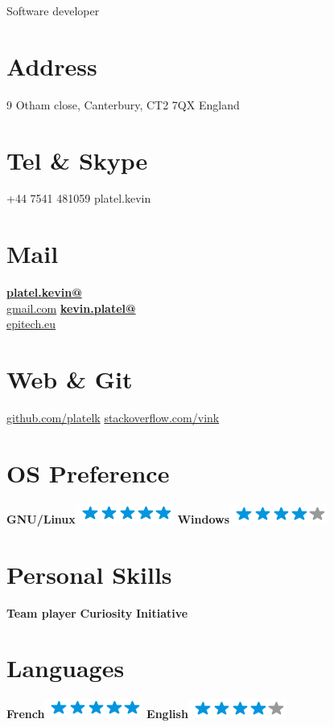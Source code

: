 \documentclass[]{friggeri-cv}
\begin{document}
      {Software developer}
      

\begin{aside}
  \section{Address}
    9 Otham close,
    Canterbury, CT2 7QX
    England
    ~
  \section{Tel \& Skype}
    +44 7541 481059
    platel.kevin
    ~
  \section{Mail}
    \href{mailto:platel.kevin@gmail.com}{\textbf{platel.kevin@}\\gmail.com}
    \href{mailto:kevin.platel@epitech.eu}{\textbf{kevin.platel@}\\epitech.eu}
    ~
  \section{Web \& Git}
    \href{https://github.com/platelk}{github.com/platelk}
    \href{http://stackoverflow.com/users/3676180/vink}{stackoverflow.com/vink}
    ~
  \section{OS Preference}
    \textbf{GNU/Linux}\includegraphics[scale=0.40]{img/5stars.png}
    \textbf{Windows}\includegraphics[scale=0.40]{img/4stars.png}
    ~
  \section{Personal Skills}
    \textbf{Team player}
    \textbf{Curiosity}
    \textbf{Initiative}
    ~
  \section{Languages}
  \textbf{French}\includegraphics[scale=0.40]{img/5stars.png}
  \textbf{English}\includegraphics[scale=0.40]{img/4stars.png}
\end{aside}
\end{document}
